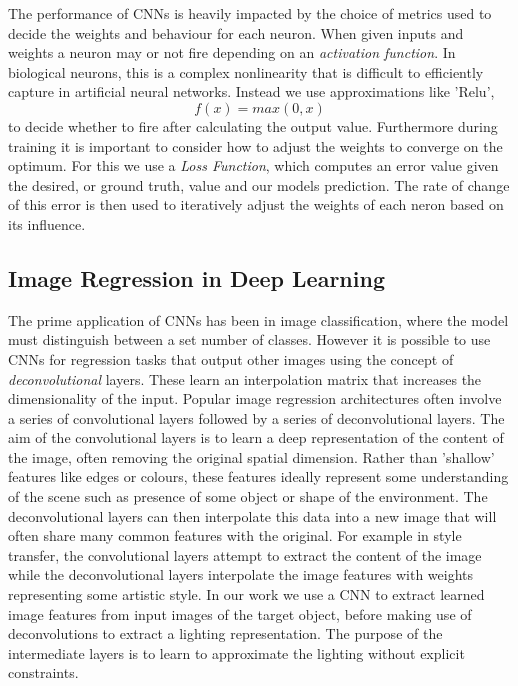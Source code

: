 \documentclass[ %
                    author={Gavin Parker},
                supervisor={Dr. Neill Campbell},
                    degree={MEng},
                     title={Deep Siamese Networks for Illumination Estimation from Stereo Images},
                  subtitle={},
                      type={research},
                      year={2018} ]{dissertation}
\begin{document}
\newline
The performance of CNNs is heavily impacted by the choice of metrics used to decide the weights and behaviour for each neuron. When given inputs and weights a neuron may or not fire depending on an \textit{activation function}. In biological neurons, this is a complex nonlinearity that is difficult to efficiently capture in artificial neural networks. Instead we use approximations like 'Relu',
\[f(x) = max(0,x)\]
to decide whether to fire after calculating the output value. Furthermore during training it is important to consider how to adjust the weights to converge on the optimum. For this we use a \textit{Loss Function}, which computes an error value given the desired, or ground truth, value and our models prediction. The rate of change of this error is then used to iteratively adjust the weights of each neron based on its influence.
\subsection{Image Regression in Deep Learning}
The prime application of CNNs has been in image classification, where the model must distinguish between a set number of classes. However it is possible to use CNNs for regression tasks that output other images using the concept of \textit{deconvolutional} layers. These learn an interpolation matrix that increases the dimensionality of the input. Popular image regression architectures often involve a series of convolutional layers followed by a series of deconvolutional layers. The aim of the convolutional layers is to learn a deep representation of the content of the image, often removing the original spatial dimension. Rather than 'shallow' features like edges or colours, these features ideally represent some understanding of the scene such as presence of some object or shape of the environment. The deconvolutional layers can then interpolate this data into a new image that will often share many common features with the original. For example in style transfer, the convolutional layers attempt to extract the content of the image while the deconvolutional layers interpolate the image features with weights representing some artistic style. In our work we use a CNN to extract learned image features from input images of the target object, before making use of deconvolutions to extract a lighting representation. The purpose of the intermediate layers is to learn to approximate the lighting without explicit constraints.
\end{document}
